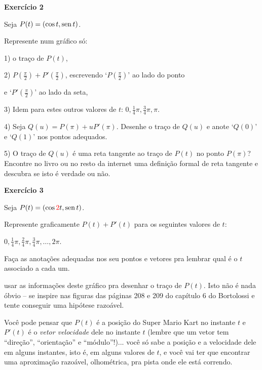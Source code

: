 \documentclass[oneside,12pt]{article}
\begin{document}
{\bf Exercício 2}

Seja $P(t) = (\cos t, \operatorname{sen} t)$.

Represente num gráfico só:

1) o traço de $P(t)$,

2) $P(\frac{π}{2}) + P'(\frac{π}{2})$, escrevendo `$P(\frac{π}{2})$'
ao lado do ponto

e `$P'(\frac{π}{2})$' ao lado da seta,

3) Idem para estes outros valores de $t$: $0, \frac14π, \frac34π, π$.

4) Seja $Q(u) = P(π) + uP'(π)$. Desenhe o traço de $Q(u)$ e anote
`$Q(0)$' e `$Q(1)$' nos pontos adequados.

\msk

5) O traço de $Q(u)$ é uma reta tangente ao traço de $P(t)$ no ponto
$P(π)$? Encontre no livro ou no resto da internet uma definição formal
de reta tangente e descubra se isto é verdade ou não.


\newpage


{\bf Exercício 3}

Seja $P(t) = (\cos \ColorRed{2}t, \sen t)$.

Represente graficamente $P(t)+P'(t)$ para os seguintes valores de $t$:

$0, \frac14π, \frac24π, \frac34π, \ldots, 2π$.

Faça as anotações adequadas nos seu pontos e vetores pra lembrar qual
é o $t$ associado a cada um.

\msk

 usar as informações deste gráfico pra desenhar o
traço de $P(t)$. Isto não é nada óbvio -- se inspire nas figuras das
páginas 208 e 209 do capítulo 6 do Bortolossi e tente conseguir uma
hipótese razoável.

Você pode pensar que $P(t)$ é a posição do Super Mario Kart no
instante $t$ e $P'(t)$ é o {\sl vetor velocidade} dele no instante $t$
(lembre que um vetor tem ``direção'', ``orientação'' e ``módulo''!)...
você só sabe a posição e a velocidade dele em alguns instantes, isto
é, em alguns valores de $t$, e você vai ter que encontrar uma
aproximação razoável, olhométrica, pra pista onde ele está correndo.




\newpage

\end{document}
